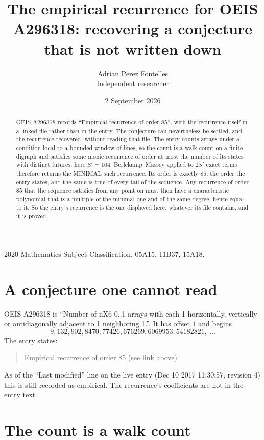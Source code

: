 \documentclass[11pt,a4paper]{article}
\title{The empirical recurrence for OEIS A296318: recovering a conjecture that is not written down}
\author{Adrian Perez Fontelles\\ \small Independent researcher}
\date{2 September 2026}
\theoremstyle{plain}
\theoremstyle{definition}
\begin{document}
\maketitle

\begin{abstract}
OEIS A296318 records ``Empirical recurrence of order $85$'', with the recurrence itself in a
linked file rather than in the entry. The conjecture can nevertheless be settled, and the
recurrence recovered, without reading that file. The entry counts arrays under a condition
local to a bounded window of lines, so the count is a walk count on a finite digraph and
satisfies some monic recurrence of order at most the number of its states with distinct
futures, here $S'=104$; Berlekamp--Massey applied to $2S'$ exact
terms therefore returns the MINIMAL such recurrence. Its order is exactly $85$, the order
the entry states, and the same is true of every tail of the sequence. Any recurrence of order
$85$ that the sequence satisfies from any point on must then have a characteristic
polynomial that is a multiple of the minimal one and of the same degree, hence equal to it. So
the entry's recurrence is the one displayed here, whatever its file contains, and it is
proved.
\end{abstract}

\noindent\small 2020 Mathematics Subject Classification. 05A15, 11B37, 15A18.\normalsize

\section{A conjecture one cannot read}

OEIS A296318 is ``Number of nX6 0..1 arrays with each 1 horizontally, vertically or antidiagonally adjacent to 1 neighboring 1.''. It has offset $1$ and begins
\[
9, 132, 902, 8470, 77426, 676269, 6069953, 54182821,\ \dots
\]
The entry states:
\begin{quote}
Empirical recurrence of order 85 (see link above)
\end{quote}
As of the ``Last modified'' line on the live entry (Dec 10 2017 11:30:57, revision 4) this is still
recorded as empirical. The recurrence's coefficients are not in the entry text.

\section{The count is a walk count}
\end{document}
